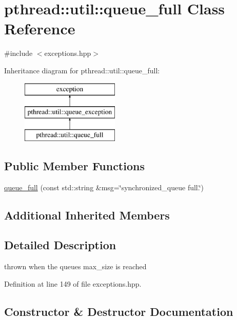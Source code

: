 \hypertarget{classpthread_1_1util_1_1queue__full}{}\section{pthread\+:\+:util\+:\+:queue\+\_\+full Class Reference}
\label{classpthread_1_1util_1_1queue__full}


{\ttfamily \#include $<$exceptions.\+hpp$>$}

Inheritance diagram for pthread\+:\+:util\+:\+:queue\+\_\+full\+:\begin{figure}[H]
\begin{center}
\leavevmode
\includegraphics[height=3.000000cm]{classpthread_1_1util_1_1queue__full}
\end{center}
\end{figure}
\subsection*{Public Member Functions}
\begin{DoxyCompactItemize}
\item 
\hyperlink{classpthread_1_1util_1_1queue__full_a5cc7fc322cb982ba871b9c92724b20c3}{queue\+\_\+full} (const std\+::string \&msg=\char`\"{}synchronized\+\_\+queue full.\char`\"{})
\end{DoxyCompactItemize}
\subsection*{Additional Inherited Members}


\subsection{Detailed Description}
thrown when the queue\textquotesingle{}s max\+\_\+size is reached 

Definition at line 149 of file exceptions.\+hpp.



\subsection{Constructor \& Destructor Documentation}
